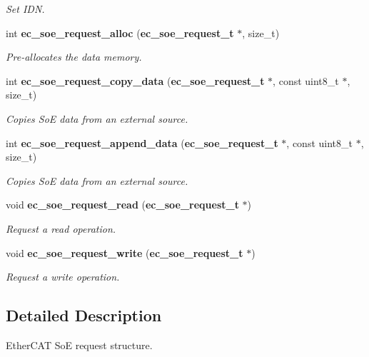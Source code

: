 \begin{DoxyCompactItemize}
\begin{DoxyCompactList}\small\item\em Set I\-D\-N. \end{DoxyCompactList}\item 
int {\bf ec\-\_\-soe\-\_\-request\-\_\-alloc} ({\bf ec\-\_\-soe\-\_\-request\-\_\-t} $\ast$, size\-\_\-t)
\begin{DoxyCompactList}\small\item\em Pre-\/allocates the data memory. \end{DoxyCompactList}\item 
int {\bf ec\-\_\-soe\-\_\-request\-\_\-copy\-\_\-data} ({\bf ec\-\_\-soe\-\_\-request\-\_\-t} $\ast$, const uint8\-\_\-t $\ast$, size\-\_\-t)
\begin{DoxyCompactList}\small\item\em Copies So\-E data from an external source. \end{DoxyCompactList}\item 
int {\bf ec\-\_\-soe\-\_\-request\-\_\-append\-\_\-data} ({\bf ec\-\_\-soe\-\_\-request\-\_\-t} $\ast$, const uint8\-\_\-t $\ast$, size\-\_\-t)
\begin{DoxyCompactList}\small\item\em Copies So\-E data from an external source. \end{DoxyCompactList}\item 
void {\bf ec\-\_\-soe\-\_\-request\-\_\-read} ({\bf ec\-\_\-soe\-\_\-request\-\_\-t} $\ast$)\label{soe__request_8h_a68954a5a60ba8dc64abb442be9481e67}

\begin{DoxyCompactList}\small\item\em Request a read operation. \end{DoxyCompactList}\item 
void {\bf ec\-\_\-soe\-\_\-request\-\_\-write} ({\bf ec\-\_\-soe\-\_\-request\-\_\-t} $\ast$)\label{soe__request_8h_a3aaef8f08907e15aad18c6b72995fec9}

\begin{DoxyCompactList}\small\item\em Request a write operation. \end{DoxyCompactList}\end{DoxyCompactItemize}


\subsection{Detailed Description}
Ether\-C\-A\-T So\-E request structure. 

